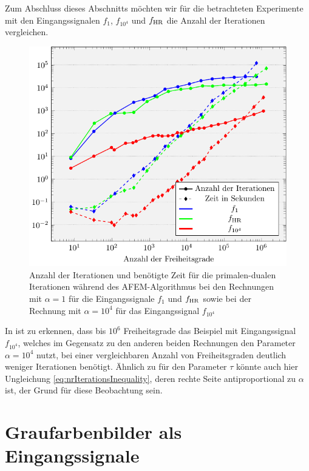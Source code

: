 Zum Abschluss dieses Abschnitts möchten wir für die betrachteten Experimente
mit den Eingangssignalen $f_1$, $f_{10^4}$ und $f_\textup{HR}$ die Anzahl der
Iterationen vergleichen.
\begin{figure}[p]
  \centering
  \includegraphics[width=.8\linewidth]
    {pictures/chapExperiments/secConclusion/nrIterComp/exactSol/misc.pdf}
  \caption{Anzahl der Iterationen und benötigte Zeit für die primalen-dualen
    Iterationen während des AFEM-Algorithmus bei den Rechnungen mit $\alpha=1$
    für die Eingangssignale $f_1$ und $f_\textup{HR}$ sowie bei der Rechnung mit
    $\alpha=10^4$ für das Eingangssignal $f_{10^4}$} 
  \label{fig:inSiNrIterComparison}
\end{figure}
In  ist zu erkennen, dass bis $10^6$
Freiheitsgrade das Beispiel mit Eingangssignal $f_{10^4}$, welches im Gegensatz
zu den anderen beiden Rechnungen den Parameter $\alpha=10^4$ nutzt, bei einer
vergleichbaren Anzahl von Freiheitsgraden deutlich weniger Iterationen
benötigt. 
Ähnlich zu  für den Parameter
$\tau$ könnte auch hier Ungleichung \eqref{eq:nrIterationsInequality}, deren
rechte Seite antiproportional zu $\alpha$ ist, der Grund für diese Beobachtung
sein.



\section{Graufarbenbilder als Eingangssignale}
\label{sec:grayscalePicturesAsInputSignal}

